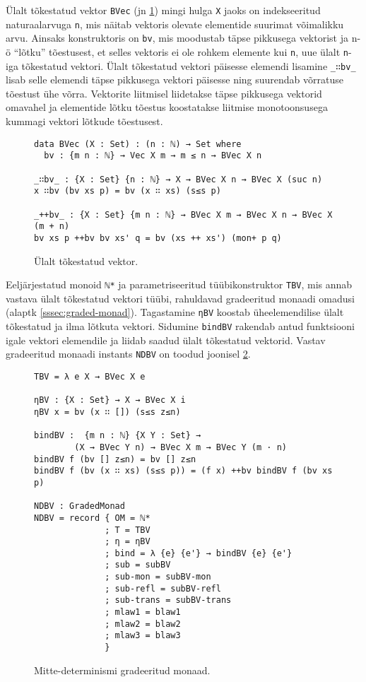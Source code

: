 \documentclass[a4paper,12pt]{article}
\begin{document}
Ülalt tõkestatud vektor {\tt BVec} (jn \ref{fig:nd.bvec}) mingi hulga {\tt X} jaoks on indekseeritud naturaalarvuga {\tt n}, mis näitab vektoris olevate elementide suurimat võimalikku arvu.
Ainsaks konstruktoris on {\tt bv}, mis moodustab täpse pikkusega vektorist ja n-ö ``lõtku'' tõestusest, et selles vektoris ei ole rohkem elemente kui {\tt n}, uue ülalt {\tt n}-iga tõkestatud vektori.
Ülalt tõkestatud vektori päisesse elemendi lisamine {\tt _∷bv_} lisab selle elemendi täpse pikkusega vektori päisesse ning suurendab võrratuse tõestust ühe võrra.
Vektorite liitmisel liidetakse täpse pikkusega vektorid omavahel ja elementide lõtku tõestus koostatakse liitmise monotoonsusega kummagi vektori lõtkude tõestusest.

\begin{figure}
  \begin{BVerbatim}
data BVec (X : Set) : (n : ℕ) → Set where
  bv : {m n : ℕ} → Vec X m → m ≤ n → BVec X n

_∷bv_ : {X : Set} {n : ℕ} → X → BVec X n → BVec X (suc n)
x ∷bv (bv xs p) = bv (x ∷ xs) (s≤s p)

_++bv_ : {X : Set} {m n : ℕ} → BVec X m → BVec X n → BVec X (m + n)
bv xs p ++bv bv xs' q = bv (xs ++ xs') (mon+ p q)    
  \end{BVerbatim}
  \caption{Ülalt tõkestatud vektor.}
  \label{fig:nd.bvec}
\end{figure}

Eeljärjestatud monoid {\tt ℕ*} ja parametriseeritud tüübikonstruktor {\tt TBV}, mis annab vastava ülalt tõkestatud vektori tüübi, rahuldavad gradeeritud monaadi omadusi (alaptk \ref{sssec:graded-monad}). Tagastamine {\tt ηBV} koostab üheelemendilise ülalt tõkestatud ja ilma lõtkuta vektori. Sidumine {\tt bindBV} rakendab antud funktsiooni igale vektori elemendile ja liidab saadud ülalt tõkestatud vektorid.
Vastav gradeeritud monaadi instants {\tt NDBV} on toodud joonisel \ref{fig:nd.graded-monad}.


\begin{figure}
  \begin{BVerbatim}
TBV = λ e X → BVec X e

ηBV : {X : Set} → X → BVec X i
ηBV x = bv (x ∷ []) (s≤s z≤n)

bindBV :  {m n : ℕ} {X Y : Set} →
        (X → BVec Y n) → BVec X m → BVec Y (m · n)
bindBV f (bv [] z≤n) = bv [] z≤n
bindBV f (bv (x ∷ xs) (s≤s p)) = (f x) ++bv bindBV f (bv xs p)

NDBV : GradedMonad
NDBV = record { OM = ℕ*
              ; T = TBV
              ; η = ηBV
              ; bind = λ {e} {e'} → bindBV {e} {e'}
              ; sub = subBV
              ; sub-mon = subBV-mon
              ; sub-refl = subBV-refl
              ; sub-trans = subBV-trans
              ; mlaw1 = blaw1
              ; mlaw2 = blaw2
              ; mlaw3 = blaw3
              }
  \end{BVerbatim}
  \caption{Mitte-determinismi gradeeritud monaad.}
  \label{fig:nd.graded-monad}
\end{figure}
\end{document}
